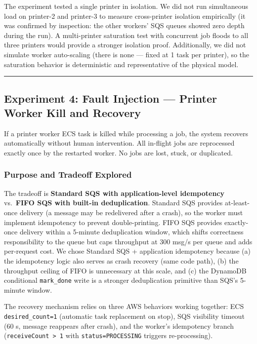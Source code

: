 \documentclass[11pt,letterpaper]{article}
\newcommand{\code}[1]{\texttt{\small #1}}
\begin{document}
\begin{limitbox}
The experiment tested a single printer in isolation. We did not run simultaneous load on printer-2 and printer-3 to measure cross-printer isolation empirically (it was confirmed by inspection: the other workers' SQS queues showed zero depth during the run). A multi-printer saturation test with concurrent job floods to all three printers would provide a stronger isolation proof. Additionally, we did not simulate worker auto-scaling (there is none --- fixed at 1 task per printer), so the saturation behavior is deterministic and representative of the physical model.
\end{limitbox}

\medskip\hrule\medskip

\subsection{Experiment 4: Fault Injection --- Printer Worker Kill and Recovery}
\label{sec:exp4}

\begin{claimbox}
If a printer worker ECS task is killed while processing a job, the system recovers automatically without human intervention. All in-flight jobs are reprocessed exactly once by the restarted worker. No jobs are lost, stuck, or duplicated.
\end{claimbox}

\subsubsection{Purpose and Tradeoff Explored}
The tradeoff is \textbf{Standard SQS with application-level idempotency} vs.\ \textbf{FIFO SQS with built-in deduplication}. Standard SQS provides at-least-once delivery (a message may be redelivered after a crash), so the worker must implement idempotency to prevent double-printing. FIFO SQS provides exactly-once delivery within a 5-minute deduplication window, which shifts correctness responsibility to the queue but caps throughput at 300 msg/s per queue and adds per-request cost. We chose Standard SQS + application idempotency because (a) the idempotency logic also serves as crash recovery (same code path), (b) the throughput ceiling of FIFO is unnecessary at this scale, and (c) the DynamoDB conditional \code{mark\_done} write is a stronger deduplication primitive than SQS's 5-minute window.

The recovery mechanism relies on three AWS behaviors working together: ECS \code{desired\_count=1} (automatic task replacement on stop), SQS visibility timeout (60 s, message reappears after crash), and the worker's idempotency branch (\code{receiveCount > 1} with \code{status=PROCESSING} triggers re-processing).
\end{document}

